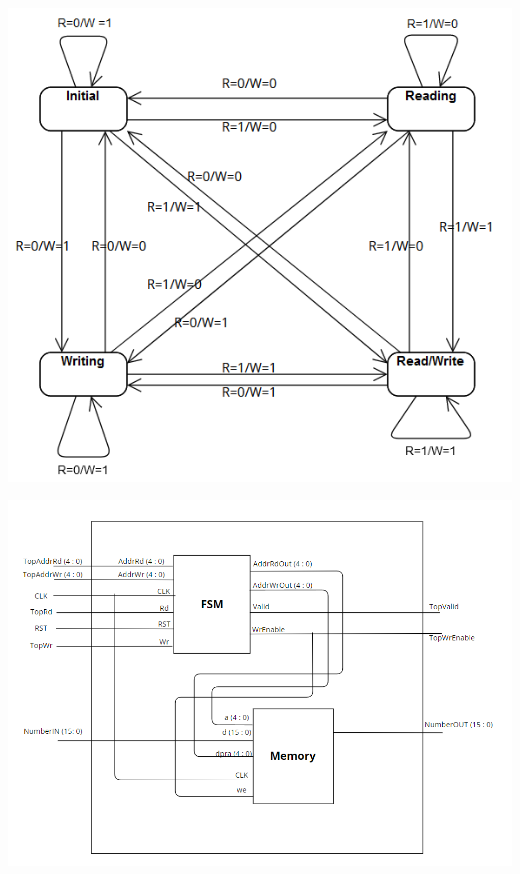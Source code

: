 \documentclass{article}
\begin{document}
\begin{minipage}[t]{0.4\textwidth}
        \includegraphics[width=\textwidth]{Images/state_diagram.png}
        \captionsetup{font=footnotesize} %
        \label{fig:scehmatic}
\end{minipage}
\hfill
\begin{minipage}[t]{0.55\textwidth}
        \includegraphics[width=\textwidth]{Images/image.png} %
        \captionsetup{font=footnotesize} %
        \label{fig:second_image}
\end{minipage}
\end{document}
